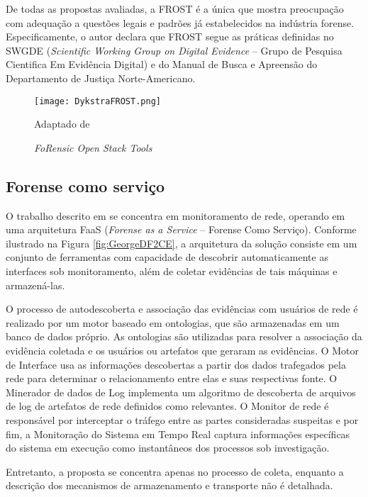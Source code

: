 De todas as propostas avaliadas, a FROST é a única que mostra preocupação com adequação a questões legais e padrões já estabelecidos na indústria forense.
%
Especificamente, o autor declara que FROST segue as práticas definidas no SWGDE (\textit{Scientific Working Group on Digital Evidence} -- Grupo de Pesquisa Cientifica Em Evidência Digital) e do Manual de Busca e Apreensão do Departamento de Justiça Norte-Americano.
%


\begin{figure}[htb!]
\footnotesize
\caption{\textit{FoRensic Open Stack Tools}}
\texttt{[image: DykstraFROST.png]}
\centering
\label{fig:DykstraFROST}
\begin{center}
Adaptado de \cite{DykstraFROST:2013} 
\end{center}
\end{figure}
%


\subsection{Forense como serviço}
\label{sec:frost}

O trabalho descrito em \cite{GeorgeDF2CE:2012} se concentra em monitoramento de rede, operando em uma arquitetura FaaS (\textit{Forense as a Service} -- Forense Como Serviço). 
%
Conforme ilustrado na Figura \ref{fig:GeorgeDF2CE}, a arquitetura da solução consiste em um conjunto de ferramentas com capacidade de descobrir automaticamente as interfaces sob monitoramento, além de coletar evidências de tais máquinas e armazená-las.


O processo de autodescoberta e associação das evidências com usuários de rede é realizado por um motor baseado em ontologias, que são armazenadas em um banco de dados próprio. 
%
As ontologias são utilizadas para resolver a associação da evidência coletada e os usuários ou artefatos que geraram as evidências.
%
O Motor de Interface usa as informações descobertas a partir dos dados trafegados pela rede para determinar o relacionamento entre elas e suas respectivas fonte.
%
O Minerador de dados de Log implementa um algoritmo de descoberta de arquivos de log de artefatos de rede definidos como relevantes.
%
O Monitor de rede é responsável por interceptar o tráfego entre as partes consideradas suspeitas e por fim, a Monitoração do Sistema em Tempo Real captura informações específicas do sistema em execução como instantâneos dos processos sob investigação.


Entretanto, a proposta se concentra apenas no processo de coleta, enquanto a descrição dos mecanismos de armazenamento e transporte não é detalhada.


